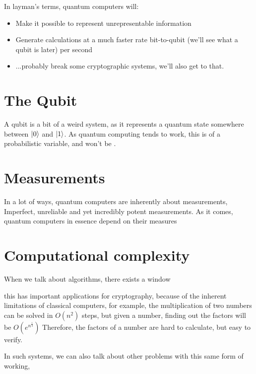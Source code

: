 \documentclass{textbook}
\begin{document}
In layman's terms, quantum computers will:

\begin{itemize}
    \item Make it possible to represent unrepresentable information
    \item Generate calculations at a much faster rate bit-to-qubit (we'll see what a qubit is later) per second
    \item ...probably break some cryptographic systems, we'll also get to that.
\end{itemize}

\section{The Qubit}

A qubit is a bit of a weird system, as it represents a quantum state somewhere between $\lvert0\rangle$ and $\lvert1\rangle$.
As quantum computing tends to work, this is of a probabilistic variable, and won't be .

\section{Measurements}

In a lot of ways, quantum computers are inherently about measurements, Imperfect, unreliable and yet incredibly potent measurements.
As it comes, quantum computers in essence depend on their measures 

\section{Computational complexity}

When we talk about algorithms, there exists a window 

this has important applications for cryptography, because of the inherent limitations of classical computers, for example,
the multiplication of two numbers can be solved in $O(n^2)$ steps, but given a number, finding out the factors will be $O(e^{n^{\frac{1}{3}}})$
Therefore, the factors of a number are hard to calculate, but easy to verify. 

In such systems, we can also talk about other problems with this same form of working, 


\end{document}

